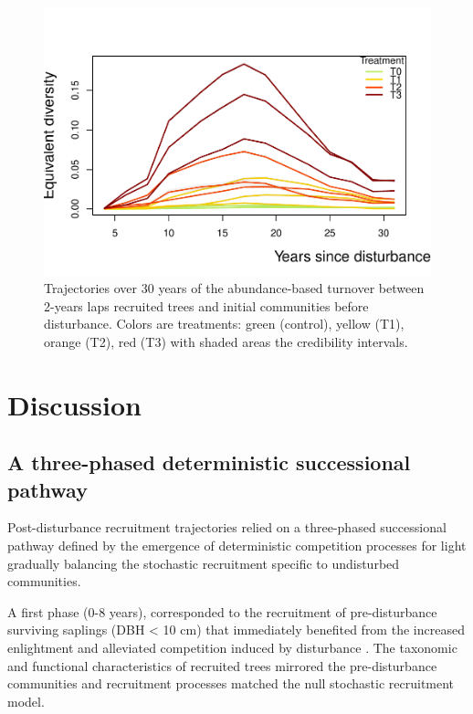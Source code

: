 \documentclass[fleqn,10pt]{ArtEcoFoG} %
\begin{document}
\begin{figure}

{\centering \includegraphics[width=1\linewidth]{RecruitmentTrajectories_files/figure-latex/Turnover-1} 

}

\caption{Trajectories over 30 years of the abundance-based turnover between 2-years laps recruited trees and initial communities before disturbance. Colors are treatments: green (control), yellow (T1), orange (T2), red (T3) with shaded areas the credibility intervals.}\label{fig:Turnover}
\end{figure}

\section{Discussion}\label{discussion}

\subsection{A three-phased deterministic successional
pathway}\label{a-three-phased-deterministic-successional-pathway}

Post-disturbance recruitment trajectories relied on a three-phased
successional pathway defined by the emergence of deterministic
competition processes for light gradually balancing the stochastic
recruitment specific to undisturbed communities.

A first phase (0-8 years), corresponded to the recruitment of
pre-disturbance surviving saplings (DBH \textless{} 10 cm) that
immediately benefited from the increased enlightment and alleviated
competition induced by disturbance \citep{Denslow2000, Herault2010}. The
taxonomic and functional characteristics of recruited trees mirrored the
pre-disturbance communities and recruitment processes matched the null
stochastic recruitment model.
\end{document}
